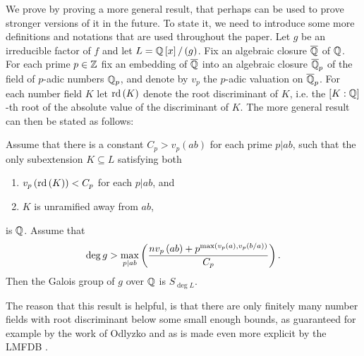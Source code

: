 \documentclass[../main.tex]{subfiles}
\begin{document}
We prove  by proving a more general result, that perhaps can be used to prove stronger versions of it in the future.
To state it, we need to introduce some more definitions and notations that are used throughout the paper.
Let $g$ be an irreducible factor of $f$ and let $L = \mathbb{Q}\left[ x \right] / \left( g \right)$.
Fix an algebraic closure $\overline{\mathbb{Q}}$ of $\mathbb{Q}$.
For each prime $p \in \mathbb{Z}$ fix an embedding of $\overline{\mathbb{Q}}$ into an algebraic closure $\overline{\mathbb{Q}}_p$ of the field of $p$-adic numbers $\mathbb{Q}_p$, and denote by $v_p$ the $p$-adic valuation on $\overline{\mathbb{Q}}_p$.
For each number field $K$ let $\operatorname{\rm rd}\left( K \right)$ denote the root discriminant of $K$, i.e. the $\left[ K : \mathbb{Q} \right]$-th root of the absolute value of the discriminant of $K$.
The more general result can then be stated as follows: 
\begin{theorem}
  \label{thm:criterion}
  Assume that there is a constant $C_p > v_p\left( ab \right)$ for each prime $p|ab$, such that the only subextension $K \subseteq L$ satisfying both  
  \begin{enumerate}
    \item $v_p\left( \operatorname{\rm rd}\left( K \right) \right) < C_p$ for each $p|ab$, and
    \item $K$ is unramified away from $ab$,
  \end{enumerate} 
  is $\mathbb{Q}$.
  Assume that 
  \[
    \deg g > \max_{p| ab}\left( \frac{n v_p\left( ab \right) + p^{\max\left( v_p\left( a \right), v_p\left( b / a \right) \right)}}{C_p} \right)
    .
  \] 
  Then the Galois group of $g$ over $\mathbb{Q}$ is $S_{\deg L}$.
\end{theorem} 
The reason that this result is helpful, is that there are only finitely many number fields with root discriminant below some small enough bounds, as guaranteed for example by the work of Odlyzko \cite{OdlyzkoBoundsII} and as is made even more explicit by the LMFDB \cite{lmfdb}.
\end{document}
